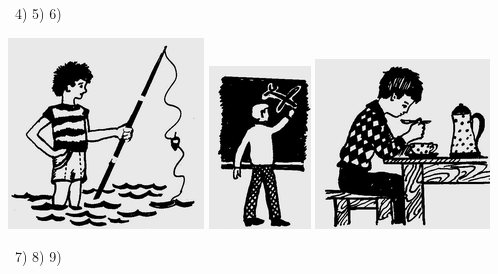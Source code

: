 \documentclass[a5paper]{article}
\begin{document}
\ 4) 5) 6)

 \includegraphics[width=2.0417in,height=1.9898in]{images/MuhammadBagauddinprettified-img298.png}   \includegraphics[width=1.0626in,height=1.698in]{images/MuhammadBagauddinprettified-img299.png}   \includegraphics[width=1.8228in,height=1.7709in]{images/MuhammadBagauddinprettified-img300.png} 

\ 7) 8) 9)
\end{document}
